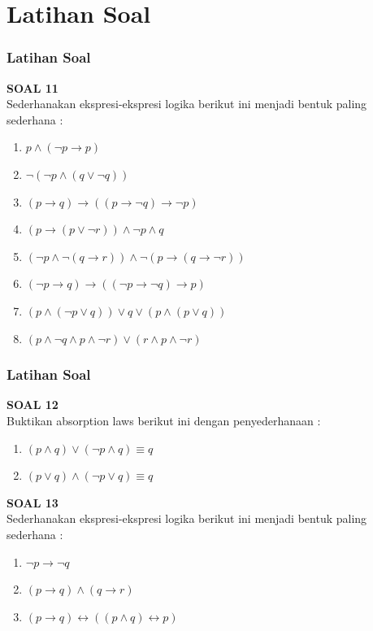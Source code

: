 \documentclass[handout]{beamer}
\theoremstyle{definition}
\theoremstyle{example}
\begin{document}
\section{Latihan Soal}
\begin{frame}
	\frametitle{Latihan Soal}
	\textbf{SOAL 11}\\
	Sederhanakan ekspresi-ekspresi logika berikut ini menjadi bentuk paling sederhana :\\
	\begin{enumerate}
		\item $ p \wedge (\neg p \rightarrow p) $
		\item $\neg (\neg p \wedge (q\vee \neg q))$
		\item $(p \rightarrow q)\rightarrow((p \rightarrow \neg q)\rightarrow \neg p)$	
		\item $(p \rightarrow(p \vee \neg r))\wedge \neg p \wedge q$
		\item $(\neg p \wedge \neg (q \rightarrow r))\wedge \neg (p \rightarrow (q \rightarrow \neg r)) $
		\item $(\neg p \rightarrow q)\rightarrow ((\neg p \rightarrow \neg q)\rightarrow p)$
		\item $(p \wedge (\neg p \vee q))\vee q \vee (p \wedge (p \vee q)) $
		\item $(p \wedge \neg q \wedge p \wedge \neg r)\vee (r \wedge p \wedge \neg r) $	
	\end{enumerate}	
\end{frame}


\begin{frame}
	\frametitle{Latihan Soal}
	\textbf{SOAL 12}\\
	Buktikan absorption laws berikut ini dengan penyederhanaan :\\
	\begin{enumerate}
		\item $ (p \wedge q)\vee(\neg p \wedge q) \equiv q $
		\item $ (p \vee q)\wedge(\neg p \vee q) \equiv q $
	\end{enumerate}	
	\textbf{SOAL 13}\\
	Sederhanakan ekspresi-ekspresi logika berikut ini menjadi bentuk paling sederhana :\\
	\begin{enumerate}
		\item $ \neg p \rightarrow \neg q $
		\item $(p \rightarrow q) \wedge (q \rightarrow r)$	
		\item $(p \rightarrow q)\leftrightarrow ((p \wedge q) \leftrightarrow p)$	
	\end{enumerate}
\end{frame}
\end{document}
